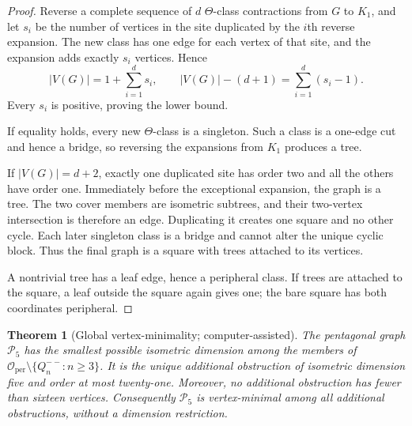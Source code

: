 \documentclass[11pt]{article}
\newtheorem{theorem}{Theorem}[section]
\theoremstyle{definition}
\theoremstyle{remark}
\newcommand{\Oper}{\mathcal O_{\mathrm{per}}}
\begin{document}
\begin{proof}
Reverse a complete sequence of \(d\) \(\Theta\)-class contractions from
\(G\) to \(K_1\), and let \(s_i\) be the number of vertices in the site
duplicated by the \(i\)th reverse expansion.  The new class has one edge for
each vertex of that site, and the expansion adds exactly \(s_i\) vertices.
Hence
\begin{equation}
 |V(G)|=1+\sum_{i=1}^d s_i,\qquad
 |V(G)|-(d+1)=\sum_{i=1}^d(s_i-1).
 \label{eq:expansion-excess}
\end{equation}
Every \(s_i\) is positive, proving the lower bound.

If equality holds, every new \(\Theta\)-class is a singleton.  Such a class
is a one-edge cut and hence a bridge, so reversing the expansions from
\(K_1\) produces a tree.

If \(|V(G)|=d+2\), exactly one duplicated site has order two and all the
others have order one.  Immediately before the exceptional expansion, the
graph is a tree.  The two cover members are isometric subtrees, and their
two-vertex intersection is therefore an edge.  Duplicating it creates one
square and no other cycle.  Each later singleton class is a bridge and
cannot alter the unique cyclic block.  Thus the final graph is a square with
trees attached to its vertices.

A nontrivial tree has a leaf edge, hence a peripheral class.  If trees are
attached to the square, a leaf outside the square again gives one; the bare
square has both coordinates peripheral.
\end{proof}

\begin{theorem}[Global vertex-minimality; computer-assisted]
\label{thm:global-minimality}
The pentagonal graph \(\mathcal P_5\) has the smallest possible isometric
dimension among the members of
\(\Oper\setminus\{Q_n^{--}:n\ge3\}\).  It is the unique additional
obstruction of isometric dimension five and order at most twenty-one.
Moreover, no additional obstruction has fewer than sixteen vertices.
Consequently \(\mathcal P_5\) is vertex-minimal among all additional
obstructions, without a dimension restriction.
\end{theorem}
\end{document}
